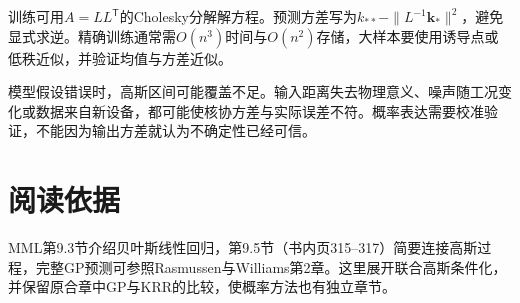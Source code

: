 训练可用$A=LL^{\mathsf T}$的Cholesky分解解方程。预测方差写为$k_{**}-\|L^{-1}\bm k_*\|^2$，避免显式求逆。精确训练通常需$O(n^3)$时间与$O(n^2)$存储，大样本要使用诱导点或低秩近似，并验证均值与方差近似。

模型假设错误时，高斯区间可能覆盖不足。输入距离失去物理意义、噪声随工况变化或数据来自新设备，都可能使核协方差与实际误差不符。概率表达需要校准验证，不能因为输出方差就认为不确定性已经可信。

\section{阅读依据}
MML第9.3节介绍贝叶斯线性回归，第9.5节（书内页315--317）简要连接高斯过程，完整GP预测可参照Rasmussen与Williams第2章。这里展开联合高斯条件化，并保留原合章中GP与KRR的比较，使概率方法也有独立章节。

